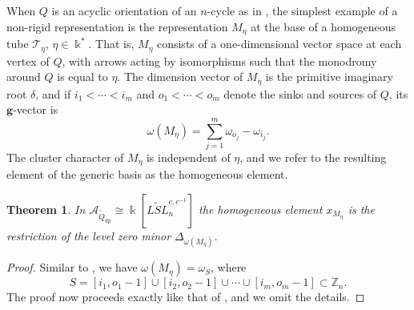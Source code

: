 \documentclass[12pt]{amsart}
\newcommand{\cA}{\mathcal{A}}
\newcommand{\ZZ}{\mathbb{Z}}
\newcommand{\kk}{\Bbbk}
\newcommand{\bfg}{\mathbf{g}}
\newcommand{\gv}{\omega}
\newcommand{\grep}{\gv}
\newcommand{\Qdp}{\widetilde{Q}_{dp}}
\newcommand{\Qrep}{M}
\newtheorem{theorem}{Theorem}[section]
\theoremstyle{remark}
\numberwithin{equation}{section}
\numberwithin{figure}{section}
\begin{document}
When $Q$ is an acyclic orientation of an $n$-cycle as in , the simplest example of a non-rigid representation is the representation $\Qrep_\eta$ at the base of a homogeneous tube $\mathcal{T}_\eta$, $\eta \in \kk^*$.
That is, $\Qrep_\eta$ consists of a one-dimensional vector space at each vertex of $Q$, with arrows acting by isomorphisms such that the monodromy around $Q$ is equal to $\eta$.
The dimension vector of $\Qrep_\eta$ is the primitive imaginary root $\delta$, and if $i_1<\cdots<i_m$ and $o_1<\cdots < o_m$ denote the sinks and sources of $Q$, its $\bfg$-vector is 
\[
  \grep(\Qrep_\eta) = \sum_{j=1}^m \omega_{o_j} - \omega_{i_j}.
\]
The cluster character of $\Qrep_\eta$ is independent of $\eta$, and we refer to the resulting element of the generic basis as the homogeneous element.

\begin{theorem}
  \label{thm:homogeneous}
  In $\cA_{\Qdp} \cong \kk[\widetilde{LSL}_n^{c,c^{-1}}]$ the homogeneous element $x_{\Qrep_\eta}$ is the restriction of the level zero minor $\Delta_{\grep(\Qrep_\eta)}$.
\end{theorem}
\begin{proof}
  Similar to , we have $\grep(\Qrep_\eta) = \omega_S$, where
  \[
    S=[i_1,o_1-1] \cup [i_2,o_2-1] \cup \cdots \cup [i_m,o_m-1] \subset \ZZ_n.
  \]
  The proof now proceeds exactly like that of , and we omit the details.
\end{proof}
\end{document}
